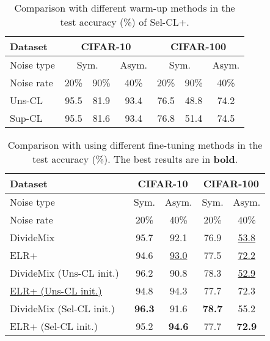 \documentclass[10pt,twocolumn,letterpaper]{article}
\begin{document}
\begin{table}[h]
	\caption{Comparison with different warm-up methods in the test accuracy (\%) of Sel-CL+.} \vspace{-5pt}
	\centering
	\small
	\setlength\tabcolsep{5pt}
	\begin{tabular}{l|c|c|c|c|c|c}
		\hline \multirow{1}{*}{Dataset} & \multicolumn{3}{c}{CIFAR-10} & \multicolumn{3}{|c}{CIFAR-100} \\
		\hline \multirow{1}{*}{Noise type} & \multicolumn{2}{c}{Sym.} & \multicolumn{1}{|c}{Asym.} & \multicolumn{2}{|c}{Sym.} & \multicolumn{1}{|c}{Asym.}\\
		\hline
		Noise rate & 
		20\% & 90\% & 40\% & 20\% & 90\% & 40\% \\
		\hline
		Uns-CL~\cite{chen2020simple} & 95.5 & 81.9 & 93.4 & 76.5 & 48.8 & 74.2   \\
		Sup-CL~\cite{Khosla2020} & 95.5 & 81.6 & 93.4 & 76.8 & 51.4  & 74.5 \\
		\hline
	\end{tabular}
	\label{warmup}
\end{table}

\begin{table}[h]
	\caption{Comparison with using different fine-tuning methods in the test accuracy (\%). The best results are in \textbf{bold}.}\vspace{-5pt} \centering
	\small
	\setlength\tabcolsep{4.5pt}
	\begin{tabular}{l|c|c|c|c}
		\hline \multirow{1}{*}{Dataset} & \multicolumn{2}{c}{CIFAR-10} & \multicolumn{2}{|c}{CIFAR-100} \\
\hline \multirow{1}{*}{Noise type} & \multicolumn{1}{c}{Sym.} & \multicolumn{1}{|c}{Asym.} & \multicolumn{1}{|c}{Sym.} & \multicolumn{1}{|c}{Asym.}\\
\hline
		Noise rate & 
		20\%  & 40\% & 20\% & 40\% \\
		\hline			
		DivideMix~\cite{LiSH20} & 95.7 & 92.1 & 76.9 & \underline{53.8}\\		
		ELR+~\cite{LiuNRF20} & 94.6 & \underline{93.0} & 77.5 & \underline{72.2} \\
		\hline
DivideMix (Uns-CL init.)~\cite{Zheltonozhskii2021} & 96.2  & 90.8 & 78.3 & \underline{52.9}\\
		\underline{ELR+ (Uns-CL init.)}~\cite{Zheltonozhskii2021} & 94.8 & 94.3 & 77.7 & 72.3 \\
		
		\hline
DivideMix (Sel-CL init.) & \textbf{96.3} & 91.6 & \textbf{78.7} & 55.2 \\
		ELR+ (Sel-CL init.) & 95.2 & \textbf{94.6} & 77.7 &  \textbf{72.9} \\
		\hline
	\end{tabular}
	\label{finetuning}
\end{table}
\end{document}
